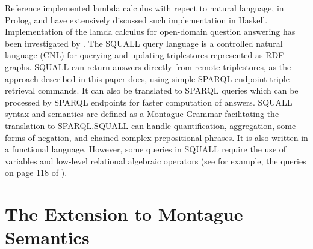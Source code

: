 \documentclass[../main.tex]{subfiles}
\begin{document}
\begin{refsection}
Reference \cite{blackburn2005representation} implemented lambda calculus with repect to natural language, in
Prolog, and \cite{van2010computational} have extensively discussed such implementation in
Haskell. Implementation of the lamda calculus for open-domain question answering has been
investigated by \cite{ahn2005question}.
The SQUALL query language \cite{ferre:squall,ferre2013squall} is a controlled natural language
(CNL) for querying and updating triplestores represented as RDF graphs. SQUALL can return
answers directly from remote triplestores, as the approach described in this paper does, using simple SPARQL-endpoint triple
retrieval commands. It can also be translated to SPARQL queries which can be processed by
SPARQL endpoints for faster computation of answers. SQUALL syntax and semantics are
defined as a Montague Grammar facilitating the translation to SPARQL.SQUALL can handle
quantification, aggregation, some forms of negation, and chained complex prepositional phrases.
It is also written in a functional language. However, some queries in SQUALL require the use of
variables and low-level relational algebraic operators (see for example, the queries on page 118
of \cite{ferre2013squall}).

\section{The Extension to Montague Semantics}


\end{refsection}
\end{document}

